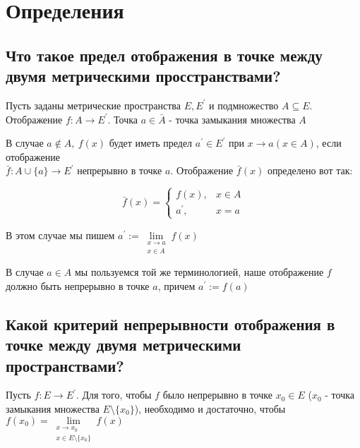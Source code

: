 \documentclass[a4paper]{article}
\begin{document}
\tableofcontents
\newpage
\section{Определения}
\subsection{Что такое предел отображения в точке между двумя метрическими просстранствами?}
Пусть заданы метрические пространства $E, E^{\prime}$ и подмножество $A \subseteq E$. Отображение $f: A \rightarrow E^{\prime}$. Точка $a \in \bar{A}$ - точка замыкания множества $A$

В случае $a \notin A,\ f(x)$ будет иметь предел $a^{\prime} \in E^{\prime}$ при $x \rightarrow a(x \in A)$, если отображение\\ $\bar{f}: A \cup\{a\} \rightarrow E^{\prime}$ непрерывно в точке $a$. Отображение $\bar{f}(x)$ определено вот так:

$$
\bar{f}(x)= \begin{cases}f(x), & x \in A \\ a^{\prime}, & x=a\end{cases}
$$

В этом случае мы пишем $a^{\prime}:=\lim\limits_{\substack{x \rightarrow a \\ x \in A}} f(x)$

В случае $a\in A$ мы пользуемся той же терминологией, наше отображение $f$ должно быть непрерывно в точке $a$, причем $a^{\prime}:=f(a)$

\subsection{Какой критерий непрерывности отображения в точке между двумя метрическими пространствами?}


Пусть $f: E \rightarrow E^{\prime}$. Для того, чтобы $f$ было непрерывно в точке $x_{0} \in E$ ($x_{0}$ - точка замыкания множества $E\setminus \{x_0\}$), необходимо и достаточно, чтобы $f(x_{0})=\lim\limits_{\substack{x \rightarrow x_{0} \\ x \in E \setminus\{x_{0}\}}} f(x)$
\end{document}
